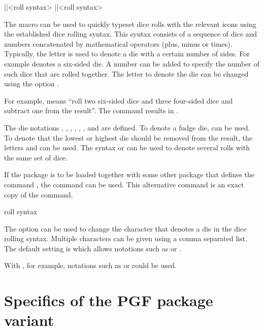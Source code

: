 \documentclass[a4paper]{article}
\begin{document}
\begin{macrodef}
|\roll|{<roll syntax>}
|\RPGIconsRoll|{<roll syntax>}
\end{macrodef}
The \macro{\roll} macro can be used to quickly typeset dice rolls with the relevant icons using the established dice rolling syntax. This syntax consists of a sequence of dice and numbers concatenated by mathematical operators (plus, minus or times). Typically, the letter  is used to denote a die with a certain number of sides. For example  denotes a six-sided die. A number can be added to specify the number of such dice that are rolled together. The letter to denote the die can be changed using the option .

For example,  means ``roll two six-sided dice and three four-sided dice and subtract one from the result''. The command  results in .

The die notations , , , , , ,  and  are defined. To denote a fudge die,  can be used. To denote that the lowest or highest die should be removed from the result, the letters  and  can be used. The syntax  or  can be used to denote several rolls with the same set of dice.

If the  package is to be loaded together with some other package that defines the command \macro{\roll}, the command \macro{\RPGIconsRoll} can be used. This alternative command is an exact copy of the \macro{\roll} command.

\begin{macrodef}
roll syntax
\end{macrodef}
The option  can be used to change the character that denotes a die in the dice rolling syntax. Multiple characters can be given using a comma separated list. The default setting is  which allows notations such as  or .

With , for example, notations such as  or  could be used.


\RenewCommandCopy\die\rpgiconsdie
\RenewCommandCopy\ability\rpgiconsability

\section{Specifics of the PGF package variant}
\end{document}

